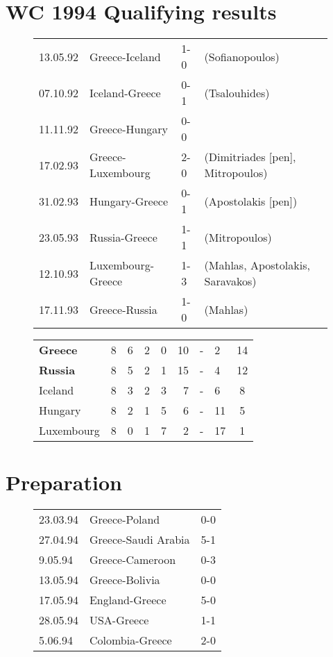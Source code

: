 \section{WC 1994 Qualifying results}
\begin{figure}[H]
\begin{tabular}{l l l l}
13.05.92 & Greece-Iceland & 1-0 & (Sofianopoulos) \\
07.10.92 & Iceland-Greece & 0-1 & (Tsalouhides) \\
11.11.92 & Greece-Hungary & 0-0 & \\
17.02.93 & Greece-Luxembourg & 2-0 & (Dimitriades [pen], Mitropoulos) \\
31.02.93 & Hungary-Greece & 0-1 & (Apostolakis [pen]) \\
23.05.93 & Russia-Greece & 1-1 & (Mitropoulos) \\
12.10.93 & Luxembourg-Greece & 1-3 & (Mahlas, Apostolakis, Saravakos) \\
17.11.93 &  Greece-Russia & 1-0 & (Mahlas) \\
\end{tabular}
\end{figure}
\begin{figure}[H]
\begin{tabular} {l c c c c r c l c}
\textbf{Greece} & 8 & 6 & 2 & 0 & 10 & - & 2 & 14 \\
\textbf{Russia} & 8 & 5 & 2 & 1 & 15 & - & 4 & 12 \\
Iceland & 8 & 3 & 2 & 3 & 7 & - & 6 & 8 \\
Hungary & 8 & 2 & 1 & 5 & 6 & - & 11 & 5 \\
Luxembourg & 8 & 0 & 1 & 7 & 2 & - & 17 & 1 \\
\end{tabular}
\end{figure}
\section{Preparation}
\begin{figure}[H]
\begin{tabular} {l l l}
23.03.94 &Greece-Poland & 0-0 \\
27.04.94 & Greece-Saudi Arabia & 5-1 \\
9.05.94 & Greece-Cameroon & 0-3 \\
13.05.94 & Greece-Bolivia & 0-0 \\
17.05.94 & England-Greece & 5-0 \\
28.05.94 & USA-Greece & 1-1 \\
5.06.94 & Colombia-Greece & 2-0 \\
\end{tabular}
\end{figure}

